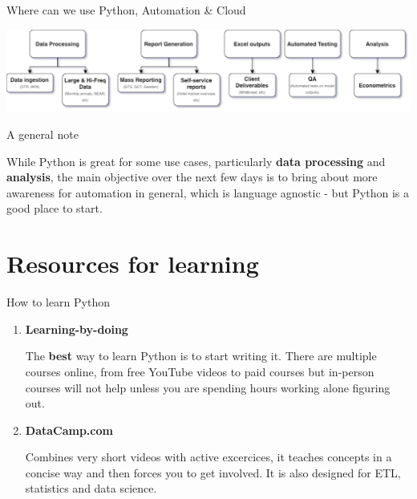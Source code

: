 \documentclass[aspectratio=169]{beamer}
\begin{document}
\begin{frame}{Where can we use Python, Automation \& Cloud}

\includegraphics[width=\linewidth]{graphics/projects.drawio.png}
	
\end{frame}


\begin{frame}{A general note}

{\Large While Python is great for some use cases, particularly \textbf{data processing} and \textbf{analysis}, the main objective over the next few days is to bring about more awareness for automation in general, which is language agnostic - but Python is a good place to start.}
	
\end{frame}



\section{Resources for learning}

\begin{frame}{How to learn Python}

\begin{enumerate}

\item \textbf{Learning-by-doing}

		The \textbf{best} way to learn Python is to start writing it. There are multiple courses online, from free YouTube videos to paid courses but in-person courses will not help unless you are spending hours working alone figuring out.
		
\item \textbf{DataCamp.com}
	
		Combines very short videos with active excercices, it teaches concepts in a concise way and then forces you to get involved. It is also designed for ETL, statistics and data science. 

	
\end{enumerate}
\end{frame}
\end{document}
